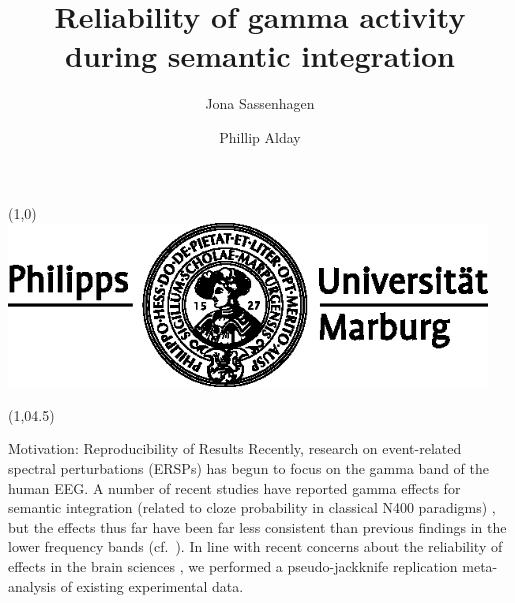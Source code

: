 \documentclass[final]{beamer}
\title{Reliability of gamma activity during semantic integration}
\author{Jona Sassenhagen \and Phillip Alday}
\institute{University of Marburg}
\date{}
\newcommand{\subblock}[1]{\bigskip\textbf{#1}}
\begin{document}
\begin{frame}{} 	
\begin{textblock}{15}(1,0)
\includegraphics[width=5in]{marburg-logo-blackwhite.eps}
\end{textblock}


\begin{textblock}{45}(1,04.5)
\begin{block}{Motivation: Reproducibility of Results}
Recently, research on event-related spectral perturbations (ERSPs) has begun to focus on the gamma band of the human EEG. A number of recent studies have reported gamma effects for semantic integration (related to cloze probability in classical N400 paradigms) \cite{mellemfriedmanmedvedev2013a,wangzhubastiaansen2012a,penolazziangrillijob2009a,hagoort2008a,hagoorthaldbastiaansen2004a}, but the effects thus far have been far less consistent than previous findings in the lower frequency bands (cf.~\cite{bastiaansenhagoort2006a,heinetammhofmann2006a,rohmklimeschhaider2001a,davidsonindefrey2007a,roehmschlesewskybornkessel2004a}).
In line with recent concerns about the reliability of effects in the brain sciences \cite{vulharriswinkielman2009a,simmonsnelsonsimonsohn2011a,kilner2013a}, we performed a pseudo-jackknife replication meta-analysis of existing experimental data. 
\end{block}


\end{textblock}
\end{frame}
\end{document}
